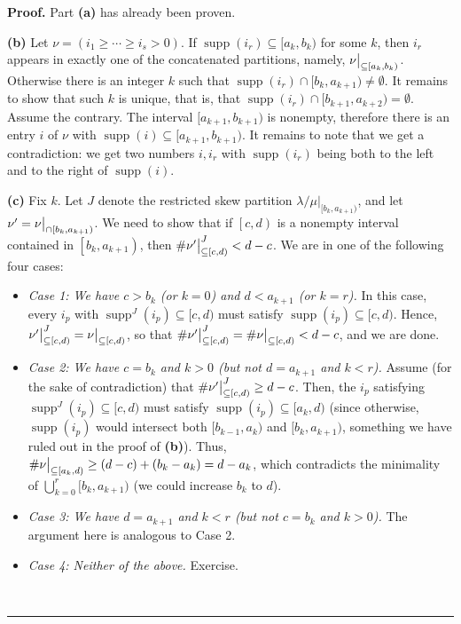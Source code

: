 \documentclass[numbers=enddot,12pt,final,onecolumn,notitlepage]{scrartcl}%
\theoremstyle{definition}
\newenvironment{proof}[1][Proof]{\noindent\textbf{#1.} }{\ \rule{0.5em}{0.5em}}
\def\seplistvar{{{\nu}}} %
\def\supp{{\operatorname{supp}}}
\def\lm{{\lambda/\mu}}
\begin{document}
\begin{proof}
Part \textbf{(a)} has already been proven.

\textbf{(b)} Let $\nu=(i_1\geq\cdots\geq i_s>0)$. If $\supp(i_r)\subseteq [a_k,b_k)$ for some $k$, then $i_r$ appears in exactly one of the concatenated partitions, namely, $\nuxy{a_k}{b_k}$. Otherwise there is an integer $k$ such that $\supp(i_r)\cap [b_k,a_{k+1})\neq\emptyset$. It remains to show that such $k$ is unique, that is, that $\supp(i_r)\cap [b_{k+1},a_{k+2})=\emptyset$. Assume the contrary. The interval $[a_{k+1},b_{k+1})$ is nonempty, therefore there is an entry $i$ of $\nu$ with $\supp(i)\subseteq [a_{k+1},b_{k+1})$. It remains to note that we get a contradiction: we get two numbers $i,i_r$ with $\supp(i_r)$ being both to the left and to the right of $\supp(i)$. 

\textbf{(c)} Fix $k$. Let $J$ denote the restricted skew partition $\lm\big|_{[b_k,a_{k+1})}$, and let $\seplistvar^{\prime} = \nuxycap{b_k}{a_{k+1}}$.
We need to show that if $\left[c,d\right)$ is a nonempty interval contained in $\left[b_k, a_{k+1}\right)$, then $\#\nupxy{c}{d}^{J} < d-c$. We are in one of the following four cases:

\begin{itemize}
\item \textit{Case 1: We have $c> b_k$ (or $k=0$) and $d< a_{k+1}$ (or $k=r$).} In this case, every $i_p$ with $\supp^J(i_p) \subseteq [c,d)$ must satisfy $\supp(i_p) \subseteq [c,d)$. Hence, $\nupxy{c}{d}^{J} = \nuxy{c}{d}$, so that $\#\nupxy{c}{d}^{J} = \#\nuxy{c}{d} < d-c$, and we are done.
\item \textit{Case 2: We have $c=b_k$ and $k>0$ (but not $d=a_{k+1}$ and $k<r$).} Assume (for the sake of contradiction) that $\#\nupxy{c}{d}^{J} \geq d-c$. Then, the $i_p$ satisfying $\supp^J(i_p) \subseteq [c,d)$ must satisfy $\supp(i_p) \subseteq [a_k, d)$ (since otherwise, $\supp(i_p)$ would intersect both $[b_{k-1}, a_k)$ and $[b_k, a_{k+1})$, something we have ruled out in the proof of \textbf{(b)}). Thus, $\#\nuxy{a_k}{d} \geq (d-c)+(b_k-a_k) = d-a_k$, which contradicts the minimality of $\bigcup_{k=0}^{r}[b_k,a_{k+1})$ (we could increase $b_k$ to $d$).
\item \textit{Case 3: We have $d=a_{k+1}$ and $k<r$ (but not $c=b_k$ and $k>0$).} The argument here is analogous to Case 2.
\item \textit{Case 4: Neither of the above.} Exercise.
\end{itemize}
\end{proof}
\end{document}
